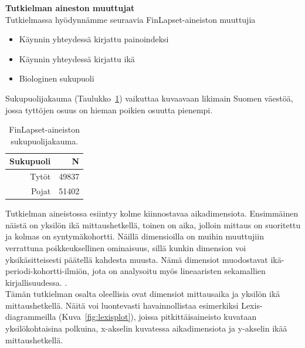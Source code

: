 \documentclass[finnish]{docopts}
\begin{document}
\textbf{Tutkielman aineston muuttujat}\\

Tutkielmassa hyödynnämme seuraavia FinLapset-aineiston muuttujia

\begin{itemize}
    \item Käynnin yhteydessä kirjattu painoindeksi
    \item Käynnin yhteydessä kirjattu ikä
    \item Biologinen sukupuoli
\end{itemize}

Sukupuolijakauma (Taulukko~\ref{table:sukupuolijakauma}) vaikuttaa kuvaavaan likimain Suomen väestöä, jossa tyttöjen osuus on hieman poikien osuutta pienempi.\\

\begin{table}[H]
\centering
\begin{tabular}{rr}
\toprule
Sukupuoli & N\\
\midrule
Tytöt & 49837\\
Pojat & 51402\\
\bottomrule
\end{tabular}
\caption{FinLapset-aineiston sukupuolijakauma.}
\label{table:sukupuolijakauma}
\end{table}

Tutkielman aineistossa esiintyy kolme kiinnostavaa aikadimensiota. Ensimmäinen näistä on yksilön ikä mittaushetkellä, toinen on aika, jolloin mittaus on suoritettu ja kolmas on syntymäkohortti. Näillä dimensioilla on muihin muuttujiin verrattuna poikkeuksellinen ominaisuus, sillä kunkin dimension voi yksikäsitteisesti päätellä kahdesta muusta. Nämä dimensiot muodostavat ikä-periodi-kohortti-ilmiön, jota on analysoitu myös lineaaristen sekamallien kirjallisuudessa. \citep{yang06}.\\

Tämän tutkielman osalta oleellisia ovat dimensiot mittausaika ja yksilön ikä mittaushetkellä. Näitä voi luontevasti havainnollistaa esimerkiksi Lexis-diagrammeilla (Kuva~\ref{fig:lexisplot}), joissa pitkittäisaineisto kuvataan yksilökohtaisina polkuina, x-akselin kuvatessa aikadimensiota ja y-akselin ikää mittaushetkellä.\\
\end{document}
